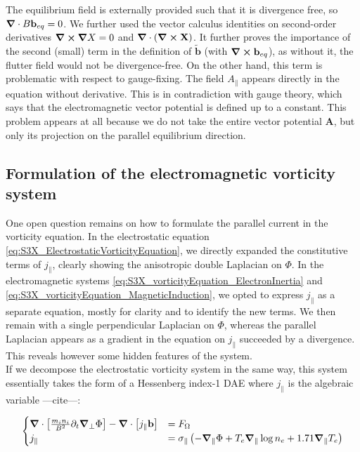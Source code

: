 The equilibrium field is externally provided such that it is divergence free, so $\grad\cdot B\mathbf{b}_{eq} = 0$. We further used the vector calculus identities on second-order derivatives $\grad\cross\grad X = 0$ and $\grad\cdot\left(\grad\cross\mathbf{X}\right)$. It further proves the importance of the second (small) term in the definition of $\mathbf{\tilde{b}}$ (with $\grad\cross\mathbf{b}_{eq}$), as without it, the flutter field would not be divergence-free. On the other hand, this term is problematic with respect to gauge-fixing. The field $A_\parallel$ appears directly in the equation without derivative. This is in contradiction with gauge theory, which says that the electromagnetic vector potential is defined up to a constant. This problem appears at all because we do not take the entire vector potential $\textbf{A}$, but only its projection on the parallel equilibrium direction. 


\subsection{Formulation of the electromagnetic vorticity system}
\label{sec:S3X_formulationEMsystem}

One open question remains on how to formulate the parallel current in the vorticity equation. In the electrostatic equation \ref{eq:S3X_ElectrostaticVorticityEquation}, we directly expanded the constitutive terms of $j_\parallel$, clearly showing the anisotropic double Laplacian on $\Phi$. In the electromagnetic systems \ref{eq:S3X_vorticityEquation_ElectronInertia} and \ref{eq:S3X_vorticityEquation_MagneticInduction}, we opted to express $j_\parallel$ as a separate equation, mostly for clarity and to identify the new terms. We then remain with a single perpendicular Laplacian on $\Phi$, whereas the parallel Laplacian appears as a gradient in the equation on $j_\parallel$ succeeded by a divergence. This reveals however some hidden features of the system. \\

If we decompose the electrostatic vorticity system in the same way, this system essentially takes the form of a Hessenberg index-1 DAE where $j_\parallel$ is the algebraic variable ---cite---:

\begin{align}
	\begin{cases}
		\grad\cdot\left[\frac{m_i n_i}{ B^2}\partial_t\grad_\perp\Phi\right] - \grad\cdot\left[j_\parallel\mathbf{b}\right]& = F_\Omega \\
		j_\parallel& = \sigma_\parallel \left(-\grad_\parallel\Phi + T_e\grad_\parallel\log n_e + 1.71\grad_\parallel T_e \right)
	\end{cases}
\end{align}



